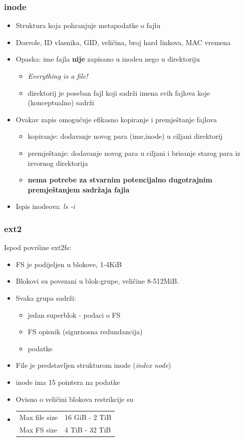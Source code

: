 \documentclass[t]{beamer}
\begin{document}
\begin{frame}
	\frametitle{inode}
	\begin{itemize}
		\item Struktura koja pohranjuje metapodatke o fajlu
		\item Dozvole, ID vlasnika, GID, veličina, broj hard linkova, MAC vremena
		\item Opaska: ime fajla \textbf{nije} zapisano u inodeu nego u direktoriju
		\begin{itemize}
			\item \emph{Everything is a file!}
			\item direktorij je poseban fajl koji sadrži imena svih fajlova koje (konceptualno) sadrži
		\end{itemize}
		\item Ovakav zapis omogućuje efikasno kopiranje i premještanje fajlova
		\begin{itemize}
			 \item kopiranje: dodavanje novog para (ime,inode) u ciljani direktorij
			 \item premještanje: dodavanje novog para u ciljani i brisanje starog para iz izvornog direktorija
			 \item \textbf{nema potrebe za stvarnim potencijalno dugotrajnim premještanjem sadržaja fajla}
		\end{itemize}
		\item Ispis inodeova: \textit{ls -i}
	\end{itemize}
\end{frame}

\begin{frame}
	\frametitle{ext2}
    Ispod površine ext2fs:

    \begin{itemize}
        \item FS je podijeljen u blokove, 1-4KiB
        \item Blokovi su povezani u blok-grupe, veličine 8-512MiB. 
        \item Svaka grupa sadrži:
        \begin{itemize}
        	\item jedan superblok - podaci o FS
        	\item FS opisnik (sigurnosna redundancija)
        	\item podatke
        \end{itemize}
        \item File je predstavljen strukturom inode (\textit{index node})
        \item inode ima 15 pointera na podatke
        \item Ovisno o veličini blokova restrikcije su
        \item[] \begin{tabular}{l l}
        	Max file size & 16 GiB - 2 TiB \\
        	Max FS size & 4 TiB - 32 TiB
        	\end{tabular}
    \end{itemize}
\end{frame}
\end{document}
